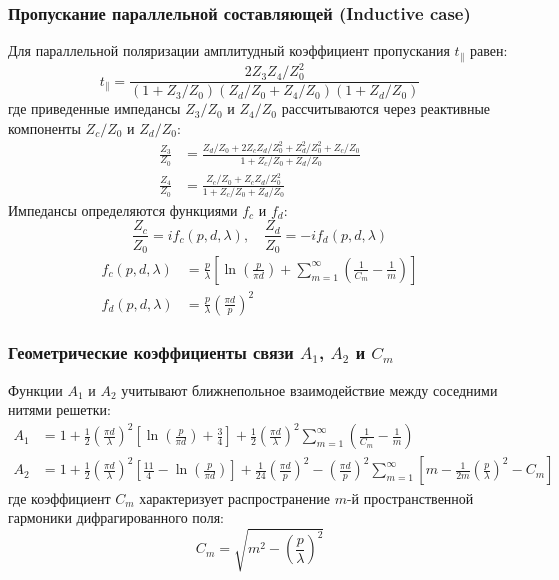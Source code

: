 \subsubsection{Пропускание параллельной составляющей (Inductive case)}
Для параллельной поляризации амплитудный коэффициент пропускания $t_\parallel$ равен:
\begin{equation}
    t_\parallel = \frac{2 Z_3 Z_4 / Z_0^2}{(1 + Z_3/Z_0)(Z_d/Z_0 + Z_4/Z_0)(1 + Z_d/Z_0)} \label{eq:t_par}
\end{equation}
где приведенные импедансы $Z_3/Z_0$ и $Z_4/Z_0$ рассчитываются через реактивные компоненты $Z_c/Z_0$ и $Z_d/Z_0$:
\begin{align}
    \frac{Z_3}{Z_0} &= \frac{Z_d/Z_0 + 2 Z_c Z_d / Z_0^2 + Z_d^2 / Z_0^2 + Z_c/Z_0}{1 + Z_c/Z_0 + Z_d/Z_0} \\
    \frac{Z_4}{Z_0} &= \frac{Z_c/Z_0 + Z_c Z_d / Z_0^2}{1 + Z_c/Z_0 + Z_d/Z_0}
\end{align}
Импедансы определяются функциями $f_c$ и $f_d$:
\begin{equation}
    \frac{Z_c}{Z_0} = i f_c\left(p, d, \lambda\right), \quad \frac{Z_d}{Z_0} = -i f_d\left(p, d, \lambda\right)
\end{equation}
\begin{align}
    f_c(p, d, \lambda) &= \frac{p}{\lambda} \left[ \ln\left(\frac{p}{\pi d}\right) + \sum_{m=1}^{\infty} \left( \frac{1}{C_m} - \frac{1}{m} \right) \right] \label{eq:fc} \\
    f_d(p, d, \lambda) &= \frac{p}{\lambda} \left( \frac{\pi d}{p} \right)^2 \label{eq:fd}
\end{align}

\subsubsection{Геометрические коэффициенты связи \texorpdfstring{$A_1$, $A_2$ и $C_m$}{A1, A2 и Cm}}
Функции $A_1$ и $A_2$ учитывают ближнепольное взаимодействие между соседними нитями решетки:
\begin{align}
    A_1 &= 1 + \frac{1}{2} \left(\frac{\pi d}{\lambda}\right)^2 \left[ \ln\left(\frac{p}{\pi d}\right) + \frac{3}{4} \right] + \frac{1}{2} \left(\frac{\pi d}{\lambda}\right)^2 \sum_{m=1}^{\infty} \left( \frac{1}{C_m} - \frac{1}{m} \right) \label{eq:A1} \\
    A_2 &= 1 + \frac{1}{2} \left(\frac{\pi d}{\lambda}\right)^2 \left[ \frac{11}{4} - \ln\left(\frac{p}{\pi d}\right) \right] + \frac{1}{24}\left(\frac{\pi d}{p}\right)^2 - \left(\frac{\pi d}{p}\right)^2 \sum_{m=1}^{\infty} \left[ m - \frac{1}{2m}\left(\frac{p}{\lambda}\right)^2 - C_m \right] \label{eq:A2}
\end{align}
где коэффициент $C_m$ характеризует распространение $m$-й пространственной гармоники дифрагированного поля:
\begin{equation}
    C_m = \sqrt{m^2 - \left(\frac{p}{\lambda}\right)^2} \label{eq:Cm}
\end{equation}

